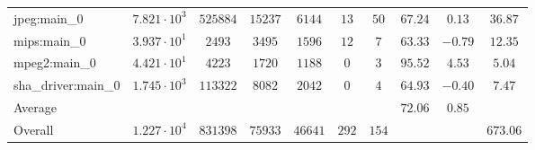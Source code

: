 \begin{tabular}{|l|c|c|c|c|c|c|c|c|c|}
jpeg:main\_0            & $ 7.821 \cdot 10^{3} $ & $ 525884 $ & $ 15237 $ & $ 6144  $ & $ 13  $ & $ 50  $ & $ 67.24       $ & $ 0.13    $ & $ 36.87   $ \\
mips:main\_0            & $ 3.937 \cdot 10^{1} $ & $ 2493   $ & $ 3495  $ & $ 1596  $ & $ 12  $ & $ 7   $ & $ 63.33       $ & $ -0.79   $ & $ 12.35   $ \\
mpeg2:main\_0           & $ 4.421 \cdot 10^{1} $ & $ 4223   $ & $ 1720  $ & $ 1188  $ & $ 0   $ & $ 3   $ & $ 95.52       $ & $ 4.53    $ & $ 5.04    $ \\
sha\_driver:main\_0     & $ 1.745 \cdot 10^{3} $ & $ 113322 $ & $ 8082  $ & $ 2042  $ & $ 0   $ & $ 4   $ & $ 64.93       $ & $ -0.40   $ & $ 7.47    $ \\
\hline
Average                 & $                    $ & $        $ & $       $ & $       $ & $     $ & $     $ & $ 72.06       $ & $ 0.85    $ & $         $ \\
\hline
Overall                 & $ 1.227 \cdot 10^{4} $ & $ 831398 $ & $ 75933 $ & $ 46641 $ & $ 292 $ & $ 154 $ & $             $ & $         $ & $ 673.06  $ \\
\hline
\end{tabular}
